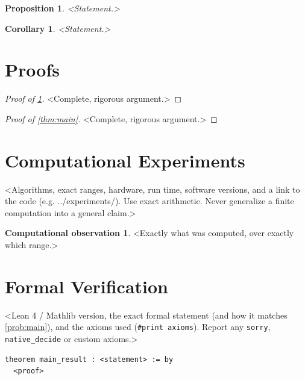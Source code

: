 \documentclass[11pt]{amsart}
\theoremstyle{plain}
\newtheorem{proposition}[theorem]{Proposition}
\newtheorem{corollary}[theorem]{Corollary}
\theoremstyle{definition}
\newtheorem{observation}[theorem]{Computational observation}
\theoremstyle{remark}
\numberwithin{equation}{section}
\begin{document}
\begin{proposition}\label{prop:example}
<Statement.>
\end{proposition}

\begin{corollary}\label{cor:example}
<Statement.>
\end{corollary}

\section{Proofs}\label{sec:proofs}
\begin{proof}[Proof of \cref{prop:example}]
<Complete, rigorous argument.>
\end{proof}

\begin{proof}[Proof of \cref{thm:main}]
<Complete, rigorous argument.>
\end{proof}

\section{Computational Experiments}\label{sec:computation}
<Algorithms, exact ranges, hardware, run time, software versions, and a link to the code (e.g. ../experiments/). Use exact arithmetic. Never generalize a finite computation into a general claim.>

\begin{observation}\label{obs:example}
<Exactly what was computed, over exactly which range.>
\end{observation}

\section{Formal Verification}\label{sec:formal}
<Lean 4 / Mathlib version, the exact formal statement (and how it matches \cref{prob:main}), and the axioms used (\texttt{\#print axioms}). Report any \texttt{sorry}, \texttt{native\_decide} or custom axioms.>

\begin{lstlisting}[language={},caption={Formal statement}]
theorem main_result : <statement> := by
  <proof>
\end{lstlisting}
\end{document}

